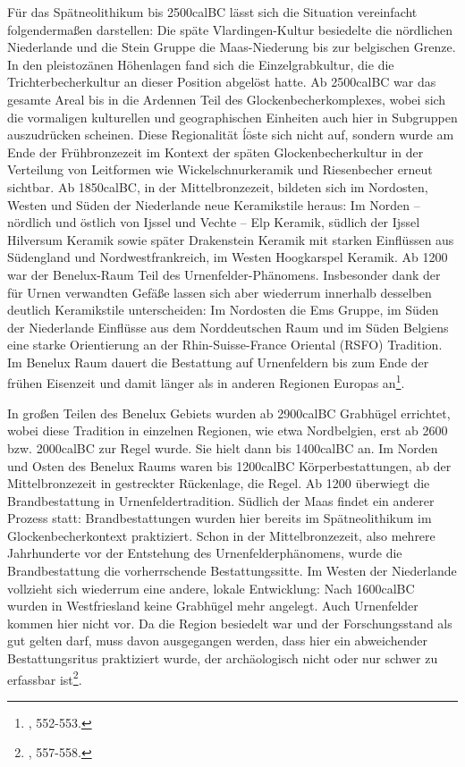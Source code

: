 \documentclass[openany,twoside,twocolumn]{book}
\let\rmarkdownfootnote\footnote%
\def\footnote{\protect\rmarkdownfootnote}
\begin{document}
Für das Spätneolithikum bis 2500calBC lässt sich die Situation
vereinfacht folgendermaßen darstellen: Die späte Vlardingen-Kultur
besiedelte die nördlichen Niederlande und die Stein Gruppe die
Maas-Niederung bis zur belgischen Grenze. In den pleistozänen Höhenlagen
fand sich die Einzelgrabkultur, die die Trichterbecherkultur an dieser
Position abgelöst hatte. Ab 2500calBC war das gesamte Areal bis in die
Ardennen Teil des Glockenbecherkomplexes, wobei sich die vormaligen
kulturellen und geographischen Einheiten auch hier in Subgruppen
auszudrücken scheinen. Diese Regionalität ĺöste sich nicht auf, sondern
wurde am Ende der Frühbronzezeit im Kontext der späten
Glockenbecherkultur in der Verteilung von Leitformen wie
Wickelschnurkeramik und Riesenbecher erneut sichtbar. Ab 1850calBC, in
der Mittelbronzezeit, bildeten sich im Nordosten, Westen und Süden der
Niederlande neue Keramikstile heraus: Im Norden -- nördlich und östlich
von Ijssel und Vechte -- Elp Keramik, südlich der Ijssel Hilversum
Keramik sowie später Drakenstein Keramik mit starken Einflüssen aus
Südengland und Nordwestfrankreich, im Westen Hoogkarspel Keramik. Ab
1200 war der Benelux-Raum Teil des Urnenfelder-Phänomens. Insbesonder
dank der für Urnen verwandten Gefäße lassen sich aber wiederrum
innerhalb desselben deutlich Keramikstile unterscheiden: Im Nordosten
die Ems Gruppe, im Süden der Niederlande Einflüsse aus dem Norddeutschen
Raum und im Süden Belgiens eine starke Orientierung an der
Rhin-Suisse-France Oriental (RSFO) Tradition. Im Benelux Raum dauert die
Bestattung auf Urnenfeldern bis zum Ende der frühen Eisenzeit und damit
länger als in anderen Regionen Europas an\footnote{\textcite{fokkens_bronze_2013},
  552-553.}.

In großen Teilen des Benelux Gebiets wurden ab 2900calBC Grabhügel
errichtet, wobei diese Tradition in einzelnen Regionen, wie etwa
Nordbelgien, erst ab 2600 bzw. 2000calBC zur Regel wurde. Sie hielt dann
bis 1400calBC an. Im Norden und Osten des Benelux Raums waren bis
1200calBC Körperbestattungen, ab der Mittelbronzezeit in gestreckter
Rückenlage, die Regel. Ab 1200 überwiegt die Brandbestattung in
Urnenfeldertradition. Südlich der Maas findet ein anderer Prozess statt:
Brandbestattungen wurden hier bereits im Spätneolithikum im
Glockenbecherkontext praktiziert. Schon in der Mittelbronzezeit, also
mehrere Jahrhunderte vor der Entstehung des Urnenfelderphänomens, wurde
die Brandbestattung die vorherrschende Bestattungssitte. Im Westen der
Niederlande vollzieht sich wiederrum eine andere, lokale Entwicklung:
Nach 1600calBC wurden in Westfriesland keine Grabhügel mehr angelegt.
Auch Urnenfelder kommen hier nicht vor. Da die Region besiedelt war und
der Forschungsstand als gut gelten darf, muss davon ausgegangen werden,
dass hier ein abweichender Bestattungsritus praktiziert wurde, der
archäologisch nicht oder nur schwer zu erfassbar ist\footnote{\textcite{fokkens_bronze_2013},
  557-558.}.
\end{document}

